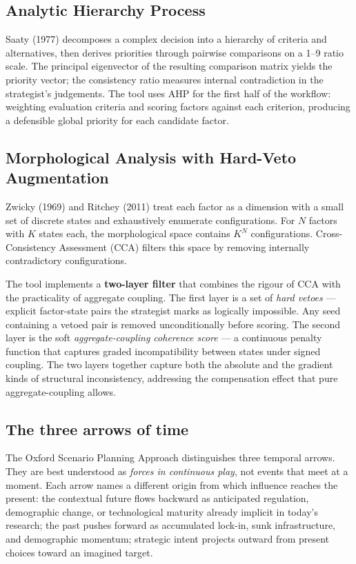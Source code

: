 \documentclass[11pt,a4paper]{article}
\begin{document}
\subsection{Analytic Hierarchy Process}

Saaty (1977) decomposes a complex decision into a hierarchy of criteria and alternatives, then derives priorities through pairwise comparisons on a 1--9 ratio scale. The principal eigenvector of the resulting comparison matrix yields the priority vector; the consistency ratio measures internal contradiction in the strategist's judgements. The tool uses AHP for the first half of the workflow: weighting evaluation criteria and scoring factors against each criterion, producing a defensible global priority for each candidate factor.

\subsection{Morphological Analysis with Hard-Veto Augmentation}

Zwicky (1969) and Ritchey (2011) treat each factor as a dimension with a small set of discrete states and exhaustively enumerate configurations. For $N$ factors with $K$ states each, the morphological space contains $K^N$ configurations. Cross-Consistency Assessment (CCA) filters this space by removing internally contradictory configurations.

The tool implements a \textbf{two-layer filter} that combines the rigour of CCA with the practicality of aggregate coupling. The first layer is a set of \emph{hard vetoes} — explicit factor-state pairs the strategist marks as logically impossible. Any seed containing a vetoed pair is removed unconditionally before scoring. The second layer is the soft \emph{aggregate-coupling coherence score} — a continuous penalty function that captures graded incompatibility between states under signed coupling. The two layers together capture both the absolute and the gradient kinds of structural inconsistency, addressing the compensation effect that pure aggregate-coupling allows.

\subsection{The three arrows of time}

The Oxford Scenario Planning Approach distinguishes three temporal arrows. They are best understood as \emph{forces in continuous play}, not events that meet at a moment. Each arrow names a different origin from which influence reaches the present: the contextual future flows backward as anticipated regulation, demographic change, or technological maturity already implicit in today's research; the past pushes forward as accumulated lock-in, sunk infrastructure, and demographic momentum; strategic intent projects outward from present choices toward an imagined target.
\end{document}
